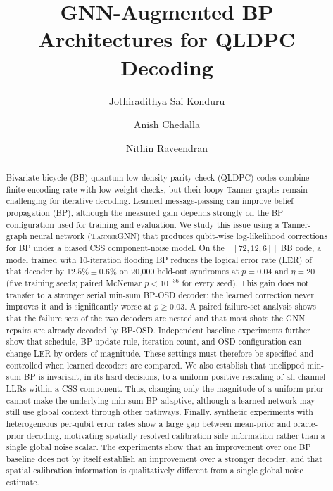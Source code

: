 \documentclass[a4paper,twocolumn,11pt,nopdfoutputerror]{quantumarticle}
\title{GNN-Augmented BP Architectures for QLDPC Decoding}
\author{Jothiradithya Sai Konduru}
\affiliation{Paradise Valley High School, Phoenix, AZ, USA}
\author{Anish Chedalla}
\affiliation{Paradise Valley High School, Phoenix, AZ, USA}
\author{Nithin Raveendran}
\affiliation{Department of Electrical and Computer Engineering,
             University of Arizona, Tucson, AZ, USA}
\newcommand{\code}[3]{\ensuremath{[\![#1,#2,#3]\!]}}
\begin{document}
\maketitle

\begin{abstract}
Bivariate bicycle (BB) quantum low-density parity-check (QLDPC) codes
combine finite encoding rate with low-weight checks, but their loopy
Tanner graphs remain challenging for iterative decoding. Learned
message-passing can improve belief propagation (BP), although the
measured gain depends strongly on the BP configuration used for
training and evaluation. We study this issue using a Tanner-graph
neural network (\textsc{TannerGNN}) that produces qubit-wise log-likelihood
corrections for BP under a biased CSS component-noise model. On the
$\code{72}{12}{6}$ BB code, a model trained with 10-iteration flooding
BP reduces the logical error rate (LER) of that decoder by
$12.5\%\pm0.6\%$ on 20{,}000 held-out syndromes at $p=0.04$ and
$\eta=20$ (five training seeds; paired McNemar $p<10^{-36}$ for every
seed). This gain does not transfer to a stronger serial min-sum BP-OSD
decoder: the learned correction never improves it and is significantly
worse at $p\geq 0.03$. A paired failure-set analysis shows that the
failure sets of the two decoders are nested and that most shots the GNN
repairs are already decoded by BP-OSD. Independent baseline
experiments further show that schedule, BP update rule, iteration count,
and OSD configuration can change LER by orders of magnitude. These
settings must therefore be specified and controlled when learned decoders
are compared.
We also establish that unclipped min-sum BP is invariant, in its hard
decisions, to a uniform positive rescaling of all channel LLRs within a
CSS component. Thus, changing only the magnitude of a uniform prior
cannot make the underlying min-sum BP adaptive, although a learned
network may still use global context through other pathways. Finally,
synthetic experiments with heterogeneous per-qubit error rates show a
large gap between mean-prior and oracle-prior decoding, motivating
spatially resolved calibration side information rather than a single
global noise scalar. The experiments show that an improvement over one BP baseline does not
by itself establish an improvement over a stronger decoder, and that
spatial calibration information is qualitatively different from a single
global noise estimate.
\end{abstract}
\end{document}
